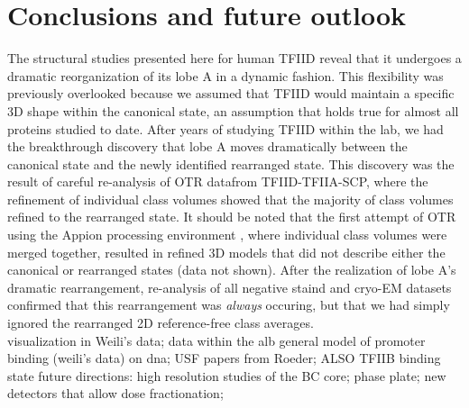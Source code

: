 \chapter{Conclusions and future outlook}

The structural studies presented here for human TFIID reveal that it undergoes a dramatic reorganization of its lobe A in a dynamic fashion. This flexibility was previously overlooked because we assumed that TFIID would maintain a specific 3D shape within the canonical state, an assumption that holds true for almost all proteins studied to date. After years of studying TFIID within the lab, we had the breakthrough discovery that lobe A moves dramatically between the canonical state and the newly identified rearranged state. This discovery was the result of careful re-analysis of OTR datafrom TFIID-TFIIA-SCP, where the refinement of individual class volumes showed that the majority of class volumes refined to the rearranged state. It should be noted that the first attempt of OTR using the Appion processing environment \cite{Lander_614}, where individual class volumes were merged together, resulted in refined 3D models that did not describe either the canonical or rearranged states (data not shown).  After the realization of lobe A's dramatic rearrangement, re-analysis of all negative staind and cryo-EM datasets confirmed that this rearrangement was \emph{always} occuring, but that we had simply ignored the rearranged 2D reference-free class averages.\\ 
\indent visualization in Weili's data; data within the alb
\indent general model of promoter binding (weili's data) on dna; USF papers from Roeder; ALSO TFIIB binding state
\indent future directions: high resolution studies of the BC core; phase plate; new detectors that allow dose fractionation;   
